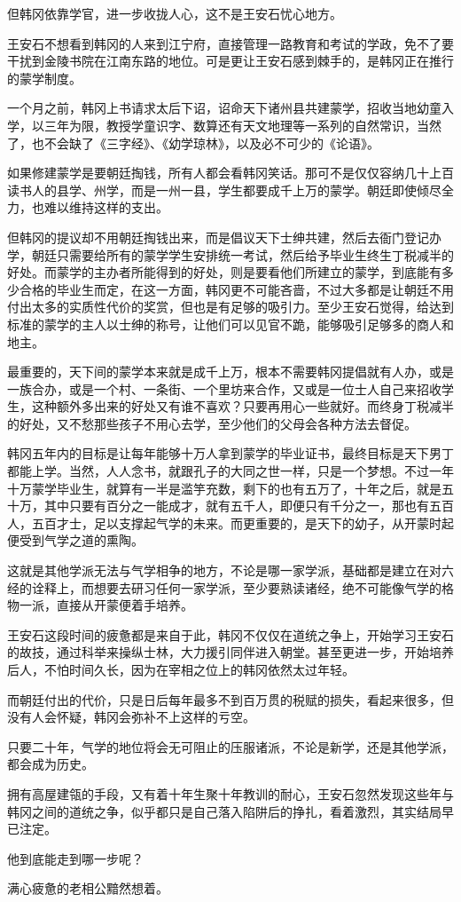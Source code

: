 但韩冈依靠学官，进一步收拢人心，这不是王安石忧心地方。

王安石不想看到韩冈的人来到江宁府，直接管理一路教育和考试的学政，免不了要干扰到金陵书院在江南东路的地位。可是更让王安石感到棘手的，是韩冈正在推行的蒙学制度。

一个月之前，韩冈上书请求太后下诏，诏命天下诸州县共建蒙学，招收当地幼童入学，以三年为限，教授学童识字、数算还有天文地理等一系列的自然常识，当然了，也不会缺了《三字经》、《幼学琼林》，以及必不可少的《论语》。

如果修建蒙学是要朝廷掏钱，所有人都会看韩冈笑话。那可不是仅仅容纳几十上百读书人的县学、州学，而是一州一县，学生都要成千上万的蒙学。朝廷即使倾尽全力，也难以维持这样的支出。

但韩冈的提议却不用朝廷掏钱出来，而是倡议天下士绅共建，然后去衙门登记办学，朝廷只需要给所有的蒙学学生安排统一考试，然后给予毕业生终生丁税减半的好处。而蒙学的主办者所能得到的好处，则是要看他们所建立的蒙学，到底能有多少合格的毕业生而定，在这一方面，韩冈更不可能吝啬，不过大多都是让朝廷不用付出太多的实质性代价的奖赏，但也是有足够的吸引力。至少王安石觉得，给达到标准的蒙学的主人以士绅的称号，让他们可以见官不跪，能够吸引足够多的商人和地主。

最重要的，天下间的蒙学本来就是成千上万，根本不需要韩冈提倡就有人办，或是一族合办，或是一个村、一条街、一个里坊来合作，又或是一位士人自己来招收学生，这种额外多出来的好处又有谁不喜欢？只要再用心一些就好。而终身丁税减半的好处，又不愁那些孩子不用心去学，至少他们的父母会各种方法去督促。

韩冈五年内的目标是让每年能够十万人拿到蒙学的毕业证书，最终目标是天下男丁都能上学。当然，人人念书，就跟孔子的大同之世一样，只是一个梦想。不过一年十万蒙学毕业生，就算有一半是滥竽充数，剩下的也有五万了，十年之后，就是五十万，其中只要有百分之一能成才，就有五千人，即便只有千分之一，那也有五百人，五百才士，足以支撑起气学的未来。而更重要的，是天下的幼子，从开蒙时起便受到气学之道的熏陶。

这就是其他学派无法与气学相争的地方，不论是哪一家学派，基础都是建立在对六经的诠释上，而想要去研习任何一家学派，至少要熟读诸经，绝不可能像气学的格物一派，直接从开蒙便着手培养。

王安石这段时间的疲惫都是来自于此，韩冈不仅仅在道统之争上，开始学习王安石的故技，通过科举来操纵士林，大力援引同伴进入朝堂。甚至更进一步，开始培养后人，不怕时间久长，因为在宰相之位上的韩冈依然太过年轻。

而朝廷付出的代价，只是日后每年最多不到百万贯的税赋的损失，看起来很多，但没有人会怀疑，韩冈会弥补不上这样的亏空。

只要二十年，气学的地位将会无可阻止的压服诸派，不论是新学，还是其他学派，都会成为历史。

拥有高屋建瓴的手段，又有着十年生聚十年教训的耐心，王安石忽然发现这些年与韩冈之间的道统之争，似乎都只是自己落入陷阱后的挣扎，看着激烈，其实结局早已注定。

他到底能走到哪一步呢？

满心疲惫的老相公黯然想着。
